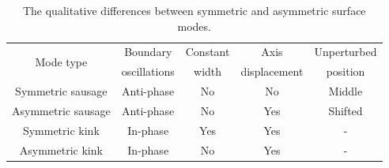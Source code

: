 \documentclass[12pt]{../style-files/ociamthesis}
\begin{document}
\cite{all_etal18c} 

\begin{table}
	\centering
	\begin{tabular}{ccccc}
		\toprule
		\multirow{2}{*}{Mode type} & Boundary & Constant & Axis & Unperturbed \\
		 & oscillations & width & displacement & position \\ \midrule
		Symmetric sausage & Anti-phase & No & No & Middle \\
		Asymmetric sausage & Anti-phase & No & Yes & Shifted \\
		Symmetric kink & In-phase & Yes & Yes & - \\
		Asymmetric kink & In-phase & No	& Yes & - \\
		\bottomrule
	\end{tabular}
	\caption{The qualitative differences between symmetric and asymmetric surface modes.}
	\label{tab: eigenmode differences}
\end{table}
\end{document}
